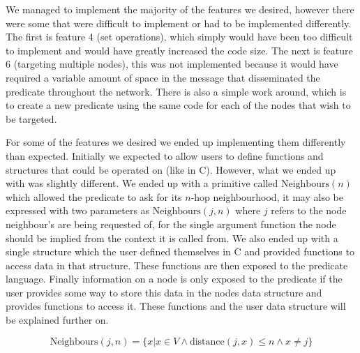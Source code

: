 We managed to implement the majority of the features we desired, however there were some that were difficult to implement or had to be implemented differently. The first is feature 4 (set operations), which simply would have been too difficult to implement and would have greatly increased the code size. The next is feature 6 (targeting multiple nodes), this was not implemented because it would have required a variable amount of space in the message that disseminated the predicate throughout the network. There is also a simple work around, which is to create a new predicate using the same code for each of the nodes that wish to be targeted.

For some of the features we desired we ended up implementing them differently than expected. Initially we expected to allow users to define functions and structures that could be operated on (like in C). However, what we ended up with was slightly different. We ended up with a primitive called $\text{Neighbours}(n)$ which allowed the predicate to ask for its $n$-hop neighbourhood, it may also be expressed with two parameters as $\text{Neighbours}(j, n)$ where $j$ refers to the node neighbour's are being requested of, for the single argument function the node should be implied from the context it is called from. We also ended up with a single structure which the user defined themselves in C and provided functions to access data in that structure. These functions are then exposed to the predicate language. Finally information on a node is only exposed to the predicate if the user provides some way to store this data in the nodes data structure and provides functions to access it. These functions and the user data structure will be explained further on.

\begin{equation}
\text{Neighbours}(j, n) = \{ x | x \in V \land \text{distance}(j, x) \leq n \land x \not= j \}
\end{equation}

